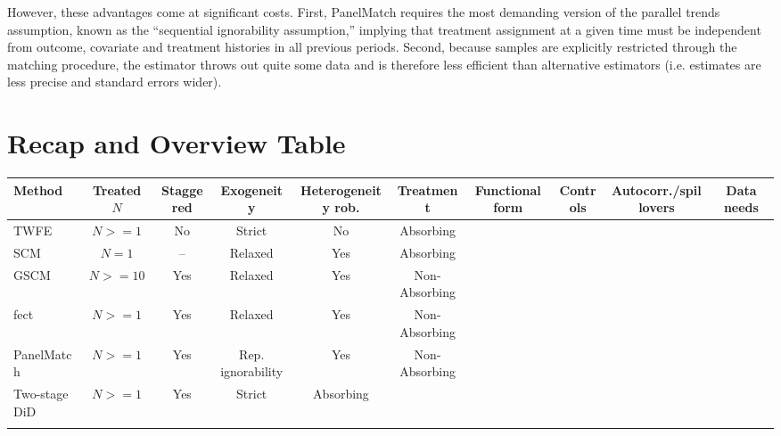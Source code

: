 \documentclass[hidelinks]{article}\usepackage[]{graphicx}\usepackage[]{color}
\begin{document}
However, these advantages come at significant costs. First, PanelMatch requires the most demanding version of the parallel trends assumption, known as the ``sequential ignorability assumption,'' implying that treatment assignment at a given time must be independent from outcome, covariate and treatment histories in all previous periods. Second, because samples are explicitly restricted through the matching procedure, the estimator throws out quite some data and is therefore less efficient than alternative estimators (i.e. estimates are less precise and standard errors wider).


\section{Recap and Overview Table}


\begin{sidewaystable}
    \centering\footnotesize
    \begin{tabular}{lccccccccc}
	\toprule
	Method & Treated $N$ & Staggered & Exogeneity & Heterogeneity rob. & Treatment & Functional form & Controls & Autocorr./spillovers & Data needs \\
	\midrule
	TWFE & $N >= 1$ & No & Strict & No & Absorbing &  &  &  &  \\	
	SCM & $N = 1$ & -- & Relaxed & Yes & Absorbing &  &  &  &  \\	
	GSCM & $N >= 10$ & Yes & Relaxed & Yes & Non-Absorbing &  &  &  &  \\	
	fect & $N >= 1$ & Yes & Relaxed & Yes & Non-Absorbing &  &  &  &  \\	
	PanelMatch & $N >= 1$ & Yes & Rep. ignorability & Yes & Non-Absorbing &  &  &  &  \\	
	Two-stage DiD & $N >= 1$ & Yes & Strict & Absorbing &  &  &  &  &  \\	
	&  &  &  &  &  &  &  &  &  \\
	\bottomrule
    \end{tabular}
\end{sidewaystable}

\printbibliography
\end{document}

